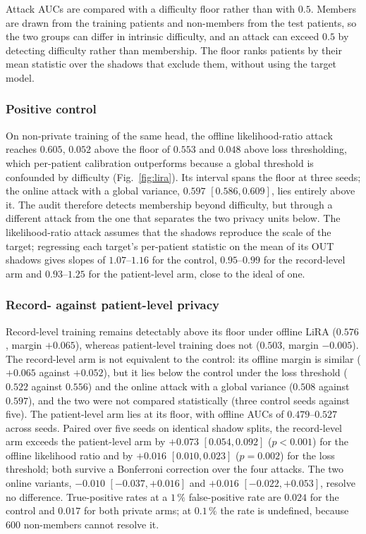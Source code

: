 Attack AUCs are compared with a difficulty floor rather than with $0.5$.
Members are drawn from the training patients and non-members from the test
patients, so the two groups can differ in intrinsic difficulty, and an attack
can exceed $0.5$ by detecting difficulty rather than membership. The floor
ranks patients by their mean statistic over the shadows that exclude them,
without using the target model.

\subsubsection{Positive control}
On non-private training of the same head, the offline likelihood-ratio attack
reaches $0.605$, $0.052$ above the floor of $0.553$ and $0.048$ above loss
thresholding, which per-patient calibration outperforms because a global
threshold is confounded by difficulty (Fig.~\ref{fig:lira}). Its interval
spans the floor at three seeds; the online attack with a global variance,
$0.597$ $[0.586, 0.609]$, lies entirely above it. The audit therefore detects
membership beyond difficulty, but through a different attack from the one
that separates the two privacy units below. The likelihood-ratio attack assumes that the
shadows reproduce the scale of the target; regressing each target's
per-patient statistic on the mean of its OUT shadows gives slopes of
$1.07$--$1.16$ for the control, $0.95$--$0.99$ for the record-level arm and
$0.93$--$1.25$ for the patient-level arm, close to the ideal of one.

\subsubsection{Record- against patient-level privacy}
Record-level training remains detectably above its floor under offline LiRA
($0.576$, margin $+0.065$), whereas patient-level training does not ($0.503$,
margin $-0.005$). The record-level arm is not equivalent to the control: its
offline margin is similar ($+0.065$ against $+0.052$), but it lies below the
control under the loss threshold ($0.522$ against $0.556$) and the online
attack with a global variance ($0.508$ against $0.597$), and the two were not
compared statistically (three control seeds against five). The patient-level
arm lies at its floor, with offline AUCs of
$0.479$--$0.527$ across seeds. Paired over five seeds on identical shadow
splits, the record-level arm exceeds the patient-level arm by $+0.073$
$[0.054, 0.092]$ ($p < 0.001$) for the offline likelihood ratio and by
$+0.016$ $[0.010, 0.023]$ ($p = 0.002$) for the loss threshold; both survive
a Bonferroni correction over the four attacks. The two online variants,
$-0.010$ $[-0.037, +0.016]$ and $+0.016$ $[-0.022, +0.053]$, resolve no
difference. True-positive rates at a $1\,\%$ false-positive rate are $0.024$
for the control and $0.017$ for both private arms; at $0.1\,\%$ the rate is
undefined, because $600$ non-members cannot resolve it.

